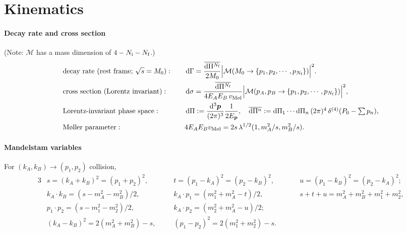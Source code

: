 \documentclass[CheatSheet]{subfiles}
\begin{document}
\summarystyle
\section{Kinematics}

\paragraph{Decay rate and cross section}  (Note: $\mathcal M$ has a mass dimension of $4-N_{\text{i}}-N_{\text{f}}$.)
\begin{alignat}{2}
&
\text{decay rate (rest frame; $\sqrt{s}=M_0$)}:
&\quad&
\dd\Gamma=
\frac{\overline{\dd\Pi^{N\w f}}}{2M_0}
\Bigl|\mathcal M(M_0\to\left\{p_1, p_2,\cdots, p_{N\w f}\right\})\Bigr|^2.
\\
&\text{cross section (Lorentz invariant)}:
&&
\dd\sigma =
\frac{\overline{\dd\Pi^{N\w f}}}{4E_AE_B\,v_{\text{M\o l}}}
\Bigl|\mathcal M(p_A,p_B\to\left\{p_1, p_2,\cdots, p_{N\w f}\right\})\Bigr|^2,
\\
&\text{Lorentz-invariant phase space}:\notag
&&
 \dd\Pi := \ddP{p}\frac{1}{2E_{\vc p}},\quad
  \overline{\dd\Pi^{n}} := {\textstyle \dd\Pi_1\cdots\dd\Pi_n\,(2\pi)^4\diracdelta[4](P_0-\sum p_n)},\\
&\text{M\o ller parameter}:\notag
&&
 4E_AE_B v_{\text{M\o l}}= 2s\Kallen[1/2](1,m_A^2/s,m_B^2/s).
\end{alignat}


\paragraph{Mandelstam variables} For $(k_A,k_B)\to(p_1,p_2)$ collision,
\begin{alignat*}{3}
 &s = (k_A+k_B)^2 = (p_1+p_2)^2, \qquad
 &&t = (p_1-k_A)^2 = (p_2-k_B)^2, \qquad
 &&u = (p_1-k_B)^2 = (p_2-k_A)^2;\\
 & k_A\cdot k_B = (s-m_A^2-m_B^2)/2,
 &&k_A\cdot p_1 = (m_1^2 + m_A^2 - t)/2,
 && s+t+u=m_A^2+m_B^2+m_1^2+m_2^2,\\
 & p_1\cdot p_2 = (s-m_1^2-m_2^2)/2,
 &&k_A\cdot p_2 = (m_2^2 + m_A^2 - u)/2;
 \\&(k_A-k_B)^2 =  2(m_A^2+m_B^2)-s,
  &&(p_1-p_2)^2 = 2(m_1^2 + m_2^2) - s.
\end{alignat*}
\end{document}
